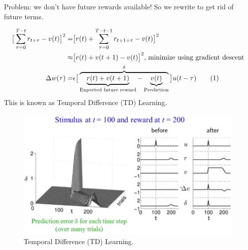 \documentclass[]{article}
\newcommand\numberthis{\addtocounter{equation}{1}\tag{\theequation}}
\begin{document}
Problem: we don't have future rewards available! So we rewrite to get rid of future terms.

\begin{align*}
	\big[\sum_{\tau=0}^{T-t}r_{t+\tau}-v(t)\big]^2=&\big[r(t) + \sum_{\tau=0}^{T-t-1}r_{t+1+\tau}-v(t)\big]^2\\
	\approx&\big[r(t)+v(t+1)-v(t)\big]^2\text{, minimize using gradient descent}\\
	\Delta w(\tau)=& \epsilon \big[\overbrace{\underbrace{r(t) + v(t+1)}_\text{Expected future reward}-\underbrace{v(t)}_\text{Prediction}}^\delta \big]u(t-\tau) \numberthis \label{eq:td:learn}
\end{align*}
This is known as Temporal Difference (TD) Learning.

\begin{figure}[H]
	\begin{center}
		\caption[Temporal Difference (TD) Learning]{Temporal Difference (TD) Learning.}
		\includegraphics[width=\textwidth]{td-learning}
	\end{center}
\end{figure}
\end{document}
